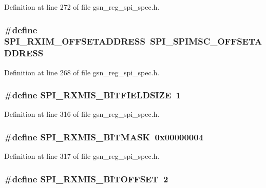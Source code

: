 Definition at line 272 of file gsn\_\-reg\_\-spi\_\-spec.h.

\hypertarget{a00573_a7247b90c01473a83bcb870f788b20428}{
\subsubsection[{SPI\_\-RXIM\_\-OFFSETADDRESS}]{\setlength{\rightskip}{0pt plus 5cm}\#define SPI\_\-RXIM\_\-OFFSETADDRESS~SPI\_\-SPIMSC\_\-OFFSETADDRESS}}
\label{a00573_a7247b90c01473a83bcb870f788b20428}


Definition at line 268 of file gsn\_\-reg\_\-spi\_\-spec.h.

\hypertarget{a00573_ad2ba92c55a5196b711026de3cc6e255b}{
\subsubsection[{SPI\_\-RXMIS\_\-BITFIELDSIZE}]{\setlength{\rightskip}{0pt plus 5cm}\#define SPI\_\-RXMIS\_\-BITFIELDSIZE~1}}
\label{a00573_ad2ba92c55a5196b711026de3cc6e255b}


Definition at line 316 of file gsn\_\-reg\_\-spi\_\-spec.h.

\hypertarget{a00573_a6703bc849f39949115183c767fd530d9}{
\subsubsection[{SPI\_\-RXMIS\_\-BITMASK}]{\setlength{\rightskip}{0pt plus 5cm}\#define SPI\_\-RXMIS\_\-BITMASK~0x00000004}}
\label{a00573_a6703bc849f39949115183c767fd530d9}


Definition at line 317 of file gsn\_\-reg\_\-spi\_\-spec.h.

\hypertarget{a00573_ab2bf8ffb23b2c1e5c63dd61e90152a6e}{
\subsubsection[{SPI\_\-RXMIS\_\-BITOFFSET}]{\setlength{\rightskip}{0pt plus 5cm}\#define SPI\_\-RXMIS\_\-BITOFFSET~2}}
\label{a00573_ab2bf8ffb23b2c1e5c63dd61e90152a6e}


